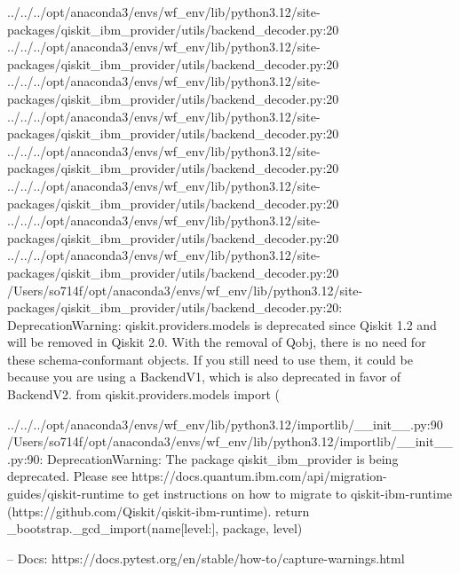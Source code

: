 ../../../opt/anaconda3/envs/wf_env/lib/python3.12/site-packages/qiskit_ibm_provider/utils/backend_decoder.py:20
../../../opt/anaconda3/envs/wf_env/lib/python3.12/site-packages/qiskit_ibm_provider/utils/backend_decoder.py:20
../../../opt/anaconda3/envs/wf_env/lib/python3.12/site-packages/qiskit_ibm_provider/utils/backend_decoder.py:20
../../../opt/anaconda3/envs/wf_env/lib/python3.12/site-packages/qiskit_ibm_provider/utils/backend_decoder.py:20
../../../opt/anaconda3/envs/wf_env/lib/python3.12/site-packages/qiskit_ibm_provider/utils/backend_decoder.py:20
../../../opt/anaconda3/envs/wf_env/lib/python3.12/site-packages/qiskit_ibm_provider/utils/backend_decoder.py:20
../../../opt/anaconda3/envs/wf_env/lib/python3.12/site-packages/qiskit_ibm_provider/utils/backend_decoder.py:20
../../../opt/anaconda3/envs/wf_env/lib/python3.12/site-packages/qiskit_ibm_provider/utils/backend_decoder.py:20
  /Users/so714f/opt/anaconda3/envs/wf_env/lib/python3.12/site-packages/qiskit_ibm_provider/utils/backend_decoder.py:20: DeprecationWarning: qiskit.providers.models is deprecated since Qiskit 1.2 and will be removed in Qiskit 2.0. With the removal of Qobj, there is no need for these schema-conformant objects. If you still need to use them, it could be because you are using a BackendV1, which is also deprecated in favor of BackendV2.
    from qiskit.providers.models import (

../../../opt/anaconda3/envs/wf_env/lib/python3.12/importlib/__init__.py:90
  /Users/so714f/opt/anaconda3/envs/wf_env/lib/python3.12/importlib/__init__.py:90: DeprecationWarning: The package qiskit_ibm_provider is being deprecated. Please see https://docs.quantum.ibm.com/api/migration-guides/qiskit-runtime to get instructions on how to migrate to qiskit-ibm-runtime (https://github.com/Qiskit/qiskit-ibm-runtime).
    return _bootstrap._gcd_import(name[level:], package, level)

-- Docs: https://docs.pytest.org/en/stable/how-to/capture-warnings.html
